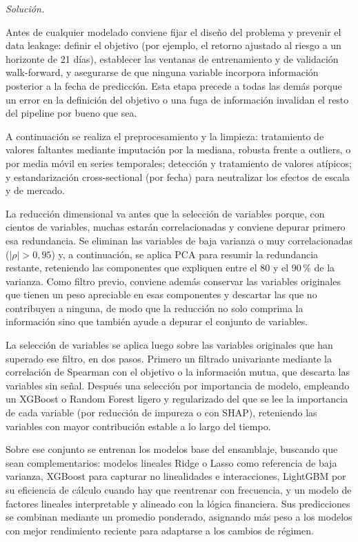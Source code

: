 \documentclass[12pt]{article}
\newcommand\sol[1]{\begin{mdframed}
\emph{Solución.} #1
\end{mdframed}}
\begin{document}
\begin{enumerate}
\sol{

Antes de cualquier modelado conviene fijar el diseño del problema y prevenir el data leakage: definir
el objetivo (por ejemplo, el retorno ajustado al riesgo a un horizonte de 21 días), establecer las
ventanas de entrenamiento y de validación walk-forward, y asegurarse de que ninguna variable
incorpora información posterior a la fecha de predicción. Esta etapa precede a todas las demás porque
un error en la definición del objetivo o una fuga de información invalidan el resto del pipeline por
bueno que sea.

A continuación se realiza el preprocesamiento y la limpieza: tratamiento de valores faltantes
mediante imputación por la mediana, robusta frente a outliers, o por media móvil en series
temporales; detección y tratamiento de valores atípicos; y estandarización cross-sectional (por
fecha) para neutralizar los efectos de escala y de mercado.

La reducción dimensional va antes que la selección de variables porque, con cientos de
variables, muchas estarán correlacionadas y conviene depurar primero esa redundancia.
Se eliminan las variables de baja varianza o muy correlacionadas ($|\rho| > 0{,}95$) y, a
continuación, se aplica PCA para resumir la redundancia restante, reteniendo las componentes que
expliquen entre el 80 y el 90\,\% de la varianza. Como filtro previo, conviene además conservar las
variables originales que tienen un peso apreciable en esas componentes y descartar las que no
contribuyen a ninguna, de modo que la reducción no solo comprima la información sino que también
ayude a depurar el conjunto de variables.

La selección de variables se aplica luego sobre las variables originales que han superado ese filtro,
en dos pasos. Primero un filtrado univariante mediante la correlación de Spearman con el objetivo o
la información mutua, que descarta las variables sin señal. Después una selección por importancia de
modelo, empleando un XGBoost o Random Forest ligero y regularizado del que se lee la importancia de
cada variable (por reducción de impureza o con SHAP), reteniendo las variables con mayor
contribución estable a lo largo del tiempo.

Sobre ese conjunto se entrenan los modelos base del ensamblaje, buscando que sean complementarios:
modelos lineales Ridge o Lasso como referencia de baja varianza, XGBoost para capturar no
linealidades e interacciones, LightGBM por su eficiencia de cálculo cuando hay que reentrenar con
frecuencia, y un modelo de factores lineales interpretable y alineado con la lógica financiera. Sus
predicciones se combinan mediante un promedio ponderado, asignando más peso a los modelos con mejor
rendimiento reciente para adaptarse a los cambios de régimen.

}
\end{enumerate}
\end{document}
